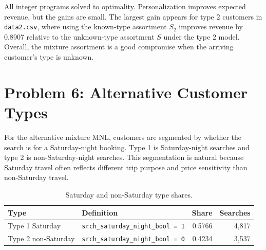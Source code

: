 \documentclass[11pt]{article}
\begin{document}
All integer programs solved to optimality. Personalization improves expected revenue, but the gains are small. The largest gain appears for type 2 customers in \texttt{data2.csv}, where using the known-type assortment $S_2$ improves revenue by 0.8907 relative to the unknown-type assortment $S$ under the type 2 model. Overall, the mixture assortment is a good compromise when the arriving customer's type is unknown.

\section{Problem 6: Alternative Customer Types}

For the alternative mixture MNL, customers are segmented by whether the search is for a Saturday-night booking. Type 1 is Saturday-night searches and type 2 is non-Saturday-night searches. This segmentation is natural because Saturday travel often reflects different trip purpose and price sensitivity than non-Saturday travel.

\begin{table}[H]
\centering
\caption{Saturday and non-Saturday type shares.}
\begin{tabular}{llrr}
\toprule
Type & Definition & Share & Searches \\
\midrule
Type 1 Saturday & \texttt{srch\_saturday\_night\_bool = 1} & 0.5766 & 4,817 \\
Type 2 non-Saturday & \texttt{srch\_saturday\_night\_bool = 0} & 0.4234 & 3,537 \\
\bottomrule
\end{tabular}
\end{table}

\begin{table}[H]
\centering
\caption{Problem 6 coefficient comparison by Saturday-night status.}
\end{table}
\end{document}
